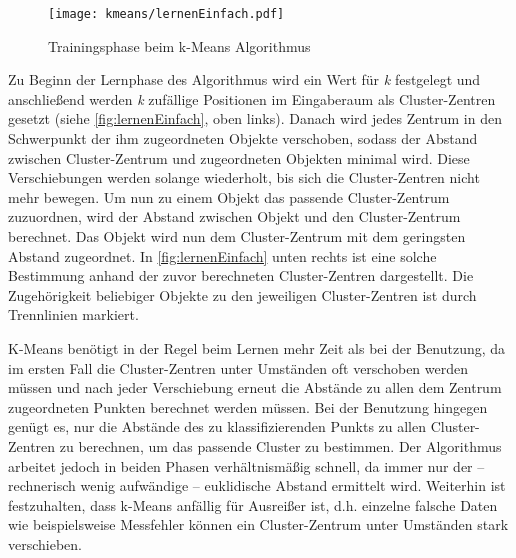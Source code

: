 \begin{figure*}[htbp]
    \centering
   \texttt{[image: kmeans/lernenEinfach.pdf]}
\caption{Trainingsphase beim k-Means Algorithmus}
\label{fig:lernenEinfach}
\end{figure*}

Zu Beginn der Lernphase des Algorithmus wird ein Wert für \emph{k} festgelegt und anschließend werden \emph{k} zufällige Positionen im Eingaberaum als Cluster-Zentren gesetzt (siehe \autoref{fig:lernenEinfach}, oben links). Danach wird jedes Zentrum in den Schwerpunkt der ihm zugeordneten Objekte verschoben, sodass der Abstand zwischen Cluster-Zentrum und zugeordneten Objekten minimal wird. Diese Verschiebungen werden solange wiederholt, bis sich die Cluster-Zentren nicht mehr bewegen. 
Um nun zu einem Objekt das passende Cluster-Zentrum zuzuordnen, wird der Abstand zwischen Objekt und den Cluster-Zentrum berechnet. Das Objekt wird nun dem Cluster-Zentrum mit dem geringsten Abstand zugeordnet. In \autoref{fig:lernenEinfach} unten rechts ist  eine solche Bestimmung anhand der zuvor berechneten Cluster-Zentren dargestellt. Die Zugehörigkeit beliebiger Objekte zu den jeweiligen Cluster-Zentren ist durch Trennlinien markiert.


K-Means benötigt in der Regel beim Lernen mehr Zeit als bei der Benutzung, da im ersten Fall die Cluster-Zentren unter Umständen oft verschoben werden müssen und nach jeder Verschiebung erneut die Abstände zu allen dem Zentrum zugeordneten Punkten berechnet werden müssen. Bei der Benutzung hingegen genügt es, nur die Abstände des zu klassifizierenden Punkts zu allen Cluster-Zentren zu berechnen, um das passende Cluster zu bestimmen. Der Algorithmus arbeitet jedoch
in beiden Phasen verhältnismäßig schnell, da immer nur 
der -- rechnerisch wenig aufwändige -- euklidische Abstand ermittelt wird.
Weiterhin ist festzuhalten, dass k-Means anfällig für Ausreißer ist, d.h. einzelne falsche Daten wie beispielsweise Messfehler können ein Cluster-Zentrum unter Umständen stark verschieben.

